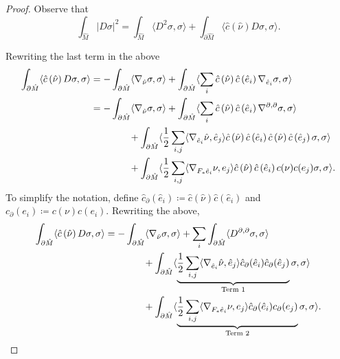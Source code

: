 \documentclass[10pt,a4paper]{amsart}
\newcommand{\bnd}[1]{\partial #1}
\newcommand{\cbar}[1]{\dom{c}\left(#1\right)}
\newcommand{\dom}[1]{\hat{#1}}
\newcommand{\inner}[1]{\langle #1 \rangle}
\newcommand{\pnorm}[1]{| #1 |}
\begin{document}
\begin{proof}
    Observe that
    \begin{equation*}
        \int_{\dom{M}} \pnorm{D \sigma}^2 = \int_{\dom{M}} \inner{D^2 \sigma, \sigma} + \int_{\bnd{\dom{M}}} \inner{\cbar{\dom{\nu}} D \sigma, \sigma}.
    \end{equation*}

    Rewriting the last term in the above
    \begin{align*}
        \int_{\bnd{\dom{M}}} \inner{\cbar{\dom{\nu}} D \sigma, \sigma} &= -\int_{\bnd{\dom{M}}} \inner{\conn[]_{\dom{\nu}} \sigma, \sigma} + \int_{\bnd{\dom{M}}} \inner{\sum_i \cbar{\dom{\nu}} \cbar{\dom{e}_i} \conn[]_{\dom{e}_i} \sigma, \sigma}\\
        &= -\int_{\bnd{\dom{M}}} \inner{\conn[]_{\dom{\nu}} \sigma, \sigma} + \int_{\bnd{\dom{M}}} \inner{\sum_i \cbar{\dom{\nu}} \cbar{\dom{e}_i} \conn[\partial, \partial] \sigma, \sigma}\\
        &\qquad\qquad + \int_{\bnd{\dom{M}}} \inner{\frac{1}{2} \sum_{i, j} \inner{\conn[]_{\dom{e}_i} \dom{\nu}, \dom{e}_j} \cbar{\dom{\nu}} \cbar{\dom{e}_i} \cbar{\dom{\nu}} \cbar{\dom{e}_j} \sigma, \sigma}\\
        &\qquad\qquad + \int_{\bnd{\dom{M}}} \inner{\frac{1}{2} \sum_{i, j} \inner{\conn[]_{F_*\dom{e}_i} \nu, e_j} \cbar{\dom{\nu}} \cbar{\dom{e}_i} c(\nu) c(e_j) \sigma, \sigma}.
    \end{align*}
    To simplify the notation, define \(\dom{c}_\partial(\dom{e}_i) \coloneqq \dom{c}(\dom{\nu}) \dom{c}(\dom{e}_i)\) and \(c_\partial(e_i) \coloneqq c(\nu) c(e_i)\).
    Rewriting the above,
    \begin{equation}\label{eqn:boundary dirac operator term}
        \begin{split}
            \int_{\bnd{\dom{M}}} \inner{\cbar{\dom{\nu}} D \sigma, \sigma} &= -\int_{\bnd{\dom{M}}} \inner{\conn[]_{\dom{\nu}} \sigma, \sigma} + \sum_i \int_{\bnd{\dom{M}}} \inner{D^{\partial, \partial} \sigma, \sigma}\\
            &\qquad\qquad + \int_{\bnd{\dom{M}}} \inner{\underbrace{\frac{1}{2} \sum_{i, j} \inner{\conn[]_{\dom{e}_i} \dom{\nu}, \dom{e}_j} \dom{c}_\partial(\dom{e}_i) \dom{c}_\partial(\dom{e}_j)}_{\text{Term 1}}\sigma , \sigma}\\
            &\qquad\qquad + \int_{\bnd{\dom{M}}} \inner{\underbrace{\frac{1}{2} \sum_{i, j} \inner{\conn[]_{F_*\dom{e}_i} \nu, e_j} \dom{c}_\partial(\dom{e}_i) c_\partial(e_j)}_{\text{Term 2}}\sigma , \sigma}.
        \end{split}
    \end{equation}


\end{proof}
\end{document}
